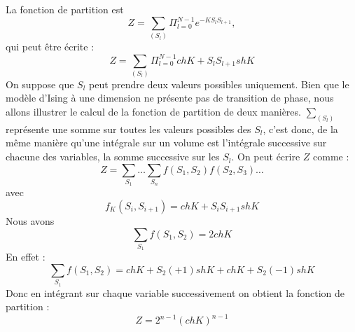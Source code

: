 \documentclass[12pt]{book}
\begin{document}
La fonction de partition est
\begin{equation}
Z=\sum_{(S_l)}\Pi_{l=0}^{N-1}e^{-KS_lS_{l+1}},
\end{equation}
qui peut \^etre \'ecrite :
\begin{equation}
Z=\sum_{(S_l)}\Pi_{l=0}^{N-1}ch K +S_lS_{l+1}sh K
\end{equation}
On suppose que $S_l$ peut prendre deux valeurs possibles uniquement.
Bien que le mod\`ele d'Ising \`a une dimension ne pr\'esente pas de
transition de phase, nous allons illustrer le calcul de la fonction de
partition de deux mani\`eres.
$\sum_{(S_l)}$ repr\'esente une somme sur toutes les valeurs possibles
des $S_l$, c'est donc, de la m\^eme mani\`ere qu'une int\'egrale sur
un volume est l'int\'egrale successive sur chacune des variables, la
somme successive sur les $S_l$. On peut \'ecrire $Z$ comme :
\begin{equation}
Z=\sum_{S_1}\dots\sum_{S_n}f(S_1,S_2)f(S_2,S_3)\dots
\end{equation}
avec
\begin{equation}
f_{K}(S_i,S_{i+1})=ch K +S_iS_{i+1}sh K
\end{equation}
Nous avons
\begin{equation}
\sum_{S_1}f(S_1,S_2)=2 ch K
\end{equation}
En effet :
\begin{equation}
\sum_{S_1}f(S_1,S_2)=ch K +S_2 (+1)shK + ch K +S_2 (-1)shK 
\end{equation}
Donc en int\'egrant sur chaque variable successivement on obtient la
fonction de partition :
\begin{equation}\label{eqZisi}
Z=2^{n-1} (ch K)^{n-1}
\end{equation}
\end{document}

